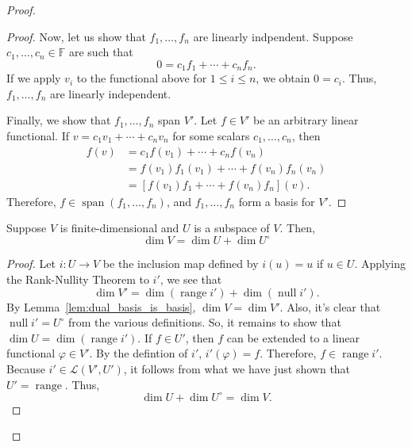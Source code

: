 \documentclass{article}
\begin{document}
\begin{proof}
\begin{enumerate}
\begin{proof}
			      Now, let us show that \(f_1, \ldots, f_n\) are linearly indpendent.
			      Suppose \(c_1, \ldots, c_n\in \mathbb{F}\) are such that
			      \[
				      0 = c_1f_1 + \cdots + c_nf_n
				      .\]
			      If we apply \(v_i\) to the functional above for \(1\leq i\leq
			      n\), we obtain \(0 = c_i\).  Thus, \(f_1, \ldots, f_n\) are
			      linearly independent.

			      Finally, we show that \(f_1, \ldots, f_n\) span \(V'\).  Let \(f\in
			      V'\) be an arbitrary linear functional.  If \(v = c_1v_1 + \cdots +
			      c_nv_n\) for some scalars \(c_1, \ldots, c_n\), then
			      \begin{align*}
				      f(v) & = c_1 f(v_1) + \cdots + c_n f(v_n)                 \\
				           & = f(v_1)f_1(v_1) + \cdots + f(v_n)f_n(v_n)         \\
				           & = \left[f(v_1) f_1 + \cdots + f(v_n) f_n\right](v)
				      .\end{align*}
			      Therefore, \(f\in \operatorname{span}(f_1, \ldots, f_n)\), and
			      \(f_1, \ldots, f_n\) form a basis for \(V'\).
		      \end{proof}

		      \begin{lemma}\label{lem:dim_annihilator}
			      Suppose \(V\) is finite-dimensional and \(U\) is a subspace of
			      \(V\).  Then,
			      \[
				      \dim V = \dim U + \dim U^{\circ}
			      \]
		      \end{lemma}
		      \begin{proof}
			      Let \(i\colon U\to V\) be the inclusion map defined by \(i(u) = u\)
			      if \(u\in U\).  Applying the Rank-Nullity Theorem to \(i'\), we see
			      that
			      \[
				      \dim V' = \dim (\operatorname{range} i') + \dim (\operatorname{null} i')
				      .\]
			      By Lemma~\ref{lem:dual_basis_is_basis}, \(\dim V = \dim V'\).
			      Also, it's clear that \(\operatorname{null} i' = U^{\circ}\) from
			      the various definitions.  So, it remains to show that \(\dim U =
			      \dim(\operatorname{range} i')\). If \(f\in U'\), then \(f\) can be
			      extended to a linear functional \(\varphi\in V'\).  By the
			      defintion of \(i'\), \(i'(\varphi) = f\).  Therefore, \(f\in
			      \operatorname{range} i'\).  Because \(i'\in \mathcal{L}(V',U')\),
			      it follows from what we have just shown that \(U' =
			      \operatorname{range}\).  Thus,
			      \[
				      \dim U + \dim U^{\circ} = \dim V
				      .\]
		      \end{proof}


\end{enumerate}
\end{proof}
\end{document}
